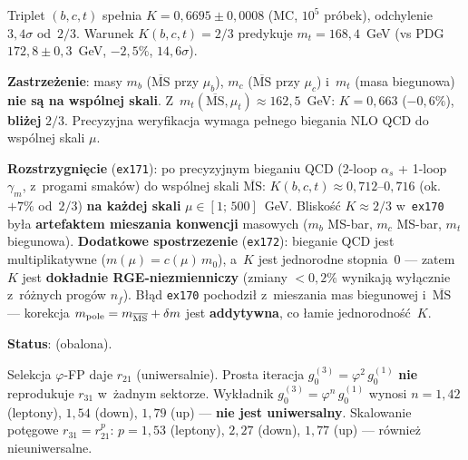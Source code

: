 \begin{remark}%
\label{rem:X-bct-analysis}
Triplet $(b,c,t)$ spe\l{}nia $K = 0{,}6695 \pm 0{,}0008$ (MC, $10^5$ pr\'obek),
odchylenie~$3{,}4\sigma$ od~$2/3$.
Warunek $K(b,c,t) = 2/3$ predykuje $m_t = 168{,}4$~GeV
(vs PDG $172{,}8 \pm 0{,}3$~GeV, $-2{,}5\%$, $14{,}6\sigma$).

\textbf{Zastrze\.zenie}: masy $m_b$ ($\overline{\text{MS}}$ przy $\mu_b$),
$m_c$ ($\overline{\text{MS}}$ przy $\mu_c$) i~$m_t$ (masa biegunowa)
\textbf{nie s\k{a} na wsp\'olnej skali}.
Z~$m_t(\overline{\text{MS}}, \mu_t) \approx 162{,}5$~GeV:
$K = 0{,}663$ ($-0{,}6\%$), \textbf{bli\.zej} $2/3$.
Precyzyjna weryfikacja wymaga pe\l{}nego biegania NLO QCD
do wsp\'olnej skali $\mu$.

\textbf{Rozstrzygni\k{e}cie} (\texttt{ex171}):
po precyzyjnym bieganiu QCD (2-loop $\alpha_s$ + 1-loop $\gamma_m$,
z~progami smak\'ow) do wsp\'olnej skali $\overline{\text{MS}}$:
$K(b,c,t) \approx 0{,}712$--$0{,}716$ (ok.\ $+7\%$ od~$2/3$)
\textbf{na ka\.zdej skali} $\mu \in [1;\, 500]$~GeV.
Blisko\'s\'c $K \approx 2/3$ w~\texttt{ex170} by\l{}a
\textbf{artefaktem mieszania konwencji} masowych
($m_b$ MS-bar, $m_c$ MS-bar, $m_t$ biegunowa).
\textbf{Dodatkowe spostrzezenie} (\texttt{ex172}):
bieganie QCD jest multiplikatywne
($m(\mu) = c(\mu)\,m_0$), a~$K$ jest jednorodne stopnia~$0$
--- zatem $K$ jest \textbf{dok\l{}adnie RGE-niezmienniczy}
(zmiany $< 0{,}2\%$ wynikaj\k{a} wy\l{}\k{a}cznie
z~r\'o\.znych prog\'ow $n_f$).
B\l{}\k{a}d \texttt{ex170} pochodzi\l{} z~mieszania
mas biegunowej i~$\overline{\text{MS}}$
--- korekcja $m_{\rm pole} = m_{\overline{\rm MS}} + \delta m$
jest \textbf{addytywna}, co \l{}amie jednorodność~$K$.

\textbf{Status}:  (obalona).
\end{remark}

\begin{result}%
\label{res:X-3rd-gen}
Selekcja $\varphi$-FP daje $r_{21}$ (uniwersalnie).
Prosta iteracja $g_0^{(3)} = \varphi^2\,g_0^{(1)}$ \textbf{nie} reprodukuje
$r_{31}$ w~\.zadnym sektorze.
Wyk\l{}adnik $g_0^{(3)} = \varphi^{n}\,g_0^{(1)}$ wynosi
$n = 1{,}42$ (leptony), $1{,}54$ (down), $1{,}79$ (up) ---
\textbf{nie jest uniwersalny}.
Skalowanie pot\k{e}gowe $r_{31} = r_{21}^p$:
$p = 1{,}53$ (leptony), $2{,}27$ (down), $1{,}77$ (up) ---
r\'ownie\.z nieuniwersalne.
\end{result}

